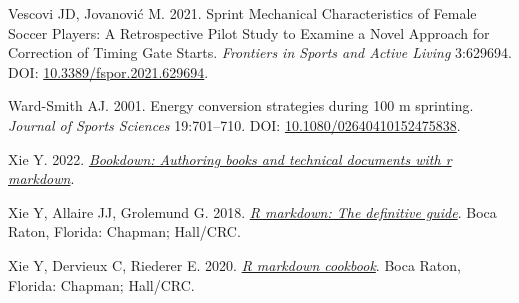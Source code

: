 \documentclass[fleqn,10pt,lineno]{wlpeerj} %
\newlength{\cslhangindent}
\newlength{\cslentryspacingunit} %
\newenvironment{CSLReferences}[2] %
 {%
  \setlength{\parindent}{0pt}
  \ifodd #1
  \let\oldpar\par
  \def\par{\hangindent=\cslhangindent\oldpar}
  \fi
  \setlength{\parskip}{#2\cslentryspacingunit}
 }%
 {}
\begin{document}
\begin{CSLReferences}{1}{0}
\leavevmode{}%
Vescovi JD, Jovanović M. 2021. Sprint {Mechanical Characteristics} of {Female Soccer Players}: {A Retrospective Pilot Study} to {Examine} a {Novel Approach} for {Correction} of {Timing Gate Starts}. \emph{Frontiers in Sports and Active Living} 3:629694. DOI: \href{https://doi.org/10.3389/fspor.2021.629694}{10.3389/fspor.2021.629694}.

\leavevmode{}%
Ward-Smith AJ. 2001. Energy conversion strategies during 100 m sprinting. \emph{Journal of Sports Sciences} 19:701--710. DOI: \href{https://doi.org/10.1080/02640410152475838}{10.1080/02640410152475838}.

\leavevmode{}%
Xie Y. 2022. \emph{\href{https://CRAN.R-project.org/package=bookdown}{Bookdown: Authoring books and technical documents with r markdown}}.

\leavevmode{}%
Xie Y, Allaire JJ, Grolemund G. 2018. \emph{\href{https://bookdown.org/yihui/rmarkdown}{R markdown: The definitive guide}}. Boca Raton, Florida: Chapman; Hall/CRC.

\leavevmode{}%
Xie Y, Dervieux C, Riederer E. 2020. \emph{\href{https://bookdown.org/yihui/rmarkdown-cookbook}{R markdown cookbook}}. Boca Raton, Florida: Chapman; Hall/CRC.

\end{CSLReferences}
\end{document}

